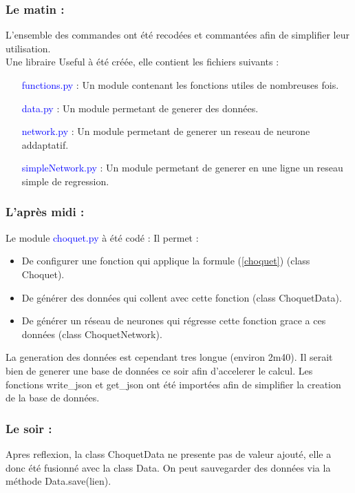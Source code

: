 \subsubsection*{Le matin :}
L'ensemble des commandes ont été recodées et commantées afin de simplifier leur utilisation. \\
Une libraire Useful à été créée, elle contient les fichiers suivants :

\begin{itemize}
    \item[\textcolor{blue}{functions.py }:] Un module contenant les fonctions utiles de nombreuses fois.
    \item[\textcolor{blue}{data.py }:] Un module permetant de generer des données.
    \item[\textcolor{blue}{network.py }:] Un module permetant de generer un reseau de neurone addaptatif.
    \item[\textcolor{blue}{simpleNetwork.py }:] Un module permetant de generer en une ligne un reseau simple de regression.
\end{itemize}

\subsubsection*{L'après midi :}
Le module \textcolor{blue}{choquet.py} à été codé :
Il permet :
\begin{itemize}
    \item De configurer une fonction qui applique la formule (\ref{choquet}) (class Choquet).
    \item De générer des données qui collent avec cette fonction (class ChoquetData).
    \item De générer un réseau de neurones qui régresse cette fonction grace a ces données (class ChoquetNetwork).
\end{itemize}

La generation des données est cependant tres longue (environ 2m40).
Il serait bien de generer une base de données ce soir afin d'accelerer le calcul.
Les fonctions write\_json et get\_json ont été importées afin de simplifier la creation de la base de données.

\subsubsection*{Le soir :}
Apres reflexion, la class ChoquetData ne presente pas de valeur ajouté, elle a donc été fusionné avec la class Data.
On peut sauvegarder des données via la méthode Data.save(lien).
